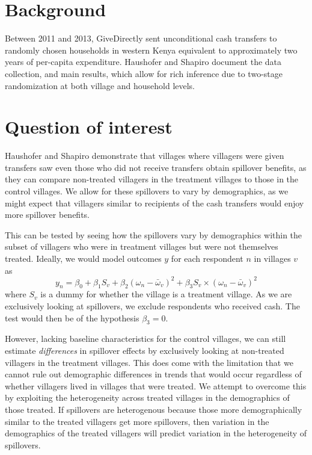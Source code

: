 \documentclass[11pt]{article}
\begin{document}
\section{Background}

Between 2011 and 2013, GiveDirectly sent unconditional cash transfers to randomly chosen households in western Kenya equivalent to approximately two years of per-capita expenditure. 
Haushofer and Shapiro document the data collection, and main results, which allow for rich inference due to two-stage randomization at both village and household levels. 


\section{Question of interest}

Haushofer and Shapiro demonstrate that villages where villagers were given transfers saw even those who did not receive transfers obtain spillover benefits, as they can compare non-treated villagers in the treatment villages to those in the control villages.
We allow for these spillovers to vary by demographics, as we might expect that villagers similar to recipients of the cash transfers would enjoy more spillover benefits.

This can be tested by seeing how the spillovers vary by demographics within the subset of villagers who were in treatment villages but were not themselves treated. 
Ideally, we would model outcomes $y$ for each respondent $n$ in villages $v$ as 
\begin{equation*}
y_n = \beta_0 + \beta_1 S_v + \beta_2 (\omega_n - \bar{\omega}_v)^2 + \beta_3 S_v \times  (\omega_n - \bar{\omega}_v)^2
\end{equation*}
where $S_v$ is a dummy for whether the village is a treatment village.
As we are exclusively looking at spillovers, we exclude respondents who received cash.
The test would then be of the hypothesis $\beta_3 = 0$.

However, lacking baseline characteristics for the control villages, we can still estimate \textit{differences} in spillover effects by exclusively looking at non-treated villagers in the treatment villages. 
This does come with the limitation that we cannot rule out demographic differences in trends that would occur regardless of whether villagers lived in villages that were treated.
We attempt to overcome this by exploiting the heterogeneity across treated villages in the demographics of those treated. 
If spillovers are heterogenous because those more demographically similar to the treated villagers get more spillovers, then variation in the demographics of the treated villagers will predict variation in the heterogeneity of spillovers.


\printbibliography
\end{document}
